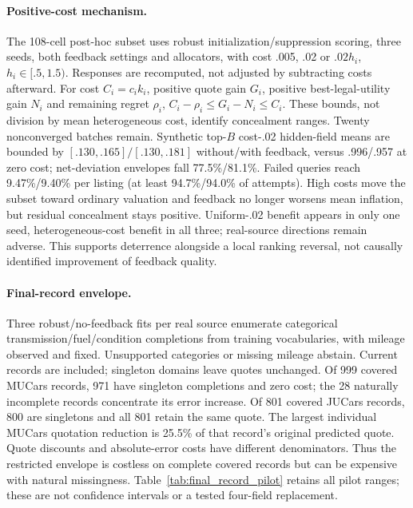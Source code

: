 \documentclass[11pt]{article}
\begin{document}
\paragraph{Positive-cost mechanism.}
The 108-cell post-hoc subset uses robust initialization/suppression scoring,
three seeds, both feedback settings and allocators, with cost .005, .02 or
$.02h_i$, $h_i\in[.5,1.5)$. Responses are recomputed, not adjusted by
subtracting costs afterward. For cost $C_i=c_i k_i$, positive quote gain
$G_i$, positive best-legal-utility gain $N_i$ and remaining regret $\rho_i$,
$C_i-\rho_i\le G_i-N_i\le C_i$. These bounds, not division by mean
heterogeneous cost, identify concealment ranges. Twenty nonconverged batches
remain. Synthetic top-$B$ cost-.02 hidden-field means are bounded by
$[.130,.165]/[.130,.181]$ without/with feedback, versus .996/.957 at zero cost;
net-deviation envelopes fall 77.5\%/81.1\%. Failed queries reach 9.47\%/9.40\%
per listing (at least 94.7\%/94.0\% of attempts). High costs move the subset
toward ordinary valuation and feedback no longer worsens mean inflation,
but residual concealment stays positive. Uniform-.02 benefit appears in only
one seed, heterogeneous-cost benefit in all three; real-source directions
remain adverse. This supports deterrence alongside a local ranking reversal,
not causally identified improvement of feedback quality.

\paragraph{Final-record envelope.}
Three robust/no-feedback fits per real source enumerate categorical
transmission/fuel/condition completions from training vocabularies, with
mileage observed and fixed. Unsupported categories or missing mileage abstain.
Current records are included; singleton domains leave quotes unchanged.
Of 999 covered MUCars records, 971 have singleton completions and zero cost;
the 28 naturally incomplete records concentrate its error increase. Of 801
covered JUCars records, 800 are singletons and all 801 retain the same quote.
The largest individual MUCars quotation reduction is 25.5\% of that
record's original predicted quote. Quote discounts and absolute-error costs
have different denominators. Thus the restricted envelope is costless on
complete covered records but can be expensive with natural missingness. Table~\ref{tab:final_record_pilot} retains all pilot ranges;
these are not confidence intervals or a tested four-field replacement.
\end{document}
